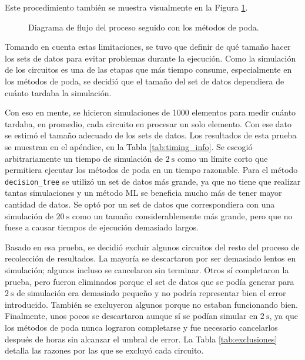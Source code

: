 Este procedimiento también se muestra visualmente en la Figura
\ref{fig:flow_poda}.

\begin{figure}[htb]
  \begin{center}
    
  \end{center}
  \caption{Diagrama de flujo del proceso seguido con los métodos de poda.}
  \label{fig:flow_poda}
\end{figure}

Tomando en cuenta estas limitaciones, se tuvo que definir de qué tamaño hacer
los sets de datos para evitar problemas durante la ejecución. Como la
simulación de los circuitos es una de las etapas que más tiempo consume,
especialmente en los métodos de poda, se decidió que el tamaño del set de datos
dependiera de cuánto tardaba la simulación.

Con eso en mente, se hicieron simulaciones de \num{1000} elementos para medir
cuánto tardaba, en promedio, cada circuito en procesar un solo elemento. Con
ese dato se estimó el tamaño adecuado de los sets de datos. Los resultados de
esta prueba se muestran en el apéndice, en la Tabla \ref{tab:timing_info}. Se
escogió arbitrariamente un tiempo de simulación de $\SI{2}{\second}$ como un
límite corto que permitiera ejecutar los métodos de poda en un tiempo razonable.
Para el método \texttt{decision\_tree} se utilizó un set de datos más grande,
ya que no tiene que realizar tantas simulaciones y un método ML se beneficia
mucho más de tener mayor cantidad de datos. Se optó por un set de datos que
correspondiera con una simulación de $\SI{20}{\second}$ como un tamaño
considerablemente más grande, pero que no fuese a causar tiempos de ejecución
demasiado largos.

Basado en esa prueba, se decidió excluir algunos circuitos del resto del
proceso de recolección de resultados. La mayoría se descartaron por ser
demasiado lentos en simulación; algunos incluso se cancelaron sin terminar.
Otros sí completaron la prueba, pero fueron eliminados porque el set de datos
que se podía generar para $\SI{2}{\second}$ de simulación era demasiado pequeño
y no podría representar bien el error introducido. También se excluyeron algunos
porque no estaban funcionando bien. Finalmente, unos pocos se descartaron
aunque sí se podían simular en $\SI{2}{\second}$, ya que los métodos de poda
nunca lograron completarse y fue necesario cancelarlos después de horas sin
alcanzar el umbral de error. La Tabla \ref{tab:exclusiones} detalla las razones
por las que se excluyó cada circuito.


